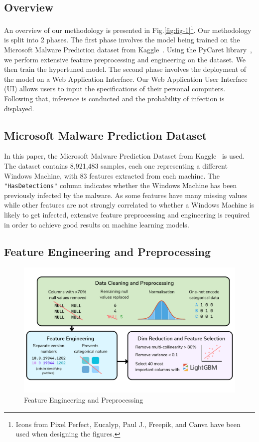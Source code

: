 \documentclass[pdflatex,sn-basic,Numbered]{sn-jnl}%
\theoremstyle{thmstyleone}%
\theoremstyle{thmstyletwo}%
\theoremstyle{thmstylethree}%
\begin{document}
\subsection{Overview}\label{subsec:overview}
An overview of our methodology is presented in Fig.\ref{fig:fig-1}\footnote[1]{Icons from Pixel Perfect, Eucalyp, Paul J., Freepik, and Canva have been used when designing the figures.}.
Our methodology is split into 2 phases.
The first phase involves the model being trained on the Microsoft Malware Prediction dataset from Kaggle~\cite{microsoft-malware-prediction}.
Using the PyCaret library~\cite{pycaret}, we perform extensive feature preprocessing and engineering on the dataset.
We then train the hypertuned model.
The second phase involves the deployment of the model on a Web Application Interface.
Our Web Application User Interface (UI) allows users to input the specifications of their personal computers.
Following that, inference is conducted and the probability of infection is displayed.

\subsection{Microsoft Malware Prediction Dataset}\label{subsec:microsoft-malware-prediction-dataset}
In this paper, the Microsoft Malware Prediction Dataset from Kaggle~\cite{microsoft-malware-prediction} is used.
The dataset contains 8,921,483 samples, each one representing a different Windows Machine, with 83 features extracted from each machine.
The \texttt{"HasDetections"} column indicates whether the Windows Machine has been previously infected by the malware.
As some features have many missing values while other features are not strongly correlated to whether a Windows Machine is likely to get infected, extensive feature preprocessing and engineering is required in order to achieve good results on machine learning models.

\subsection{Feature Engineering and Preprocessing}\label{subsec:feature-engineering-and-preprocessing}
\begin{figure}[h]
\includegraphics[scale=0.25]{images/feature_engineering}
\centering
\caption{Feature Engineering and Preprocessing}
\label{fig:fig-2}
\end{figure}
\end{document}
